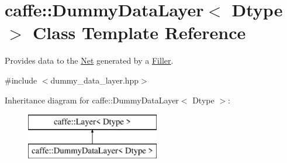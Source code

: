 \hypertarget{classcaffe_1_1DummyDataLayer}{}\section{caffe\+:\+:Dummy\+Data\+Layer$<$ Dtype $>$ Class Template Reference}
\label{classcaffe_1_1DummyDataLayer}


Provides data to the \hyperlink{classcaffe_1_1Net}{Net} generated by a \hyperlink{classcaffe_1_1Filler}{Filler}.  




{\ttfamily \#include $<$dummy\+\_\+data\+\_\+layer.\+hpp$>$}

Inheritance diagram for caffe\+:\+:Dummy\+Data\+Layer$<$ Dtype $>$\+:\begin{figure}[H]
\begin{center}
\leavevmode
\includegraphics[height=2.000000cm]{classcaffe_1_1DummyDataLayer}
\end{center}
\end{figure}
